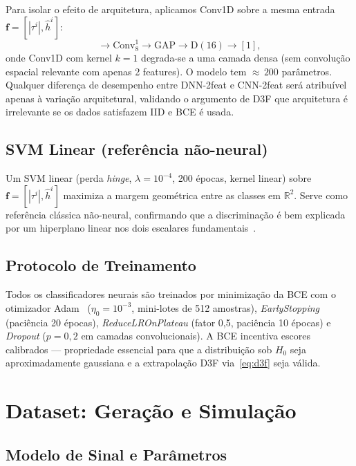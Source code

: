 \documentclass[12pt,a4paper]{article}
\begin{document}
Para isolar o efeito de arquitetura, aplicamos Conv1D sobre a mesma entrada $\mathbf{f} = [|\tau^i|, \hat{h}^i]$:
\begin{equation}
[2,1] \to \text{Conv}_{8}^{1} \to \text{GAP} \to \text{D}(16) \to [1],
\end{equation}
onde Conv1D com kernel $k=1$ degrada-se a uma camada densa (sem convolução espacial relevante com apenas 2 features). O modelo tem ${\approx}\,200$ parâmetros. Qualquer diferença de desempenho entre DNN-2feat e CNN-2feat será atribuível apenas à variação arquitetural, validando o argumento de D3F que arquitetura é irrelevante se os dados satisfazem IID e BCE é usada.

\subsection{SVM Linear (referência não-neural)}\label{sec:svm}

Um SVM linear (perda \textit{hinge}, $\lambda = 10^{-4}$, 200 épocas, kernel linear) sobre $\mathbf{f} = [|\tau^i|, \hat{h}^i]$ maximiza a margem geométrica entre as classes em $\mathbb{R}^2$. Serve como referência clássica não-neural, confirmando que a discriminação é bem explicada por um hiperplano linear nos dois escalares fundamentais~\cite{ref_poor}.

\subsection{Protocolo de Treinamento}

Todos os classificadores neurais são treinados por minimização da BCE com o otimizador Adam~\cite{ref_adam} ($\eta_0 = 10^{-3}$, mini-lotes de 512 amostras), \textit{EarlyStopping} (paciência 20 épocas), \textit{ReduceLROnPlateau} (fator 0,5, paciência 10 épocas) e \textit{Dropout} ($p = 0{,}2$ em camadas convolucionais). A BCE incentiva escores calibrados — propriedade essencial para que a distribuição sob $H_0$ seja aproximadamente gaussiana e a extrapolação D3F via~\eqref{eq:d3f} seja válida.


\section{Dataset: Geração e Simulação}

\subsection{Modelo de Sinal e Parâmetros}
\end{document}
